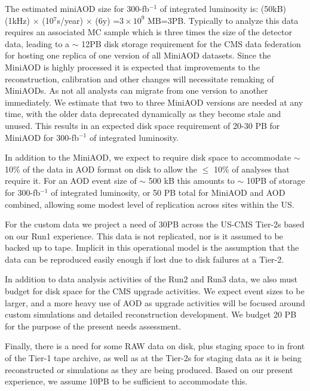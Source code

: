 \documentclass[11pt,a4paper]{article}
\begin{document}
The estimated miniAOD size for 300-fb$^{-1}$ of integrated luminosity is:
(50kB)(1kHz) $\times$ (10$^7$s/year) $\times$ (6y) =$3 \times 10^9$
MB=3PB.  Typically to analyze this data requires an associated MC sample which is three times the
size of the detector data, leading to a $\sim$ 12PB disk storage requirement for the CMS data
federation for hosting one replica of one version of all MiniAOD datasets. 
Since the MiniAOD is highly processed it is expected that improvements to the reconstruction,
calibration and other changes will necessitate remaking of MiniAODs.
As not all analysts can migrate from one version to another
immediately.  We estimate that two to three MiniAOD versions are
needed at any time, with the older data deprecated dynamically as they
become stale and unused.  This results in an expected disk space requirement of
20-30 PB for MiniAOD for 300-fb$^{-1}$ of integrated luminosity.

In addition to the MiniAOD, we expect to require disk space to accommodate 
$\sim$ 10\% of the data in AOD format on disk to allow the $\le$ 10\% of analyses that require it.
For an AOD event size of $\sim$ 500 kB this amounts to $\sim$ 10PB of storage 
for 300-fb$^{-1}$ of integrated luminosity, or 50 PB total for MiniAOD and AOD combined, allowing some modest
level of replication across sites within the US.
 
For the custom data we project a need of 30PB across the US-CMS Tier-2s based on our Run1 experience.
This data is not replicated, nor is it assumed to be backed up to tape. Implicit in this operational model is the assumption that the data
can be reproduced easily enough if lost due to disk failures at a Tier-2.

In addition to data analysis activities of the Run2 and Run3 data, we also must budget for disk space for the CMS upgrade activities.
We expect event sizes to be larger, and a more heavy use of AOD as upgrade activities will be focused around custom simulations
and detailed reconstruction development. We budget 20 PB for the purpose of the present needs assessment.

Finally, there is a need for some RAW data on disk, plus staging space to in front of the Tier-1 tape archive, as well as at the Tier-2s for 
staging data as it is being reconstructed or simulations as they are being produced. Based on our present experience, we assume
10PB to be sufficient to accommodate this.
\end{document}
